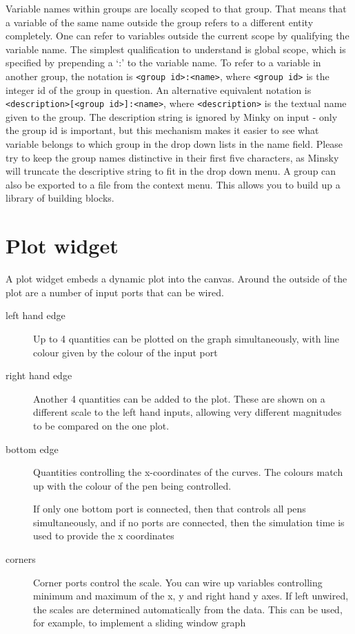 Variable names within groups are locally scoped to that group. That
means that a variable of the same name outside the group refers to a
different entity completely. One can refer to variables outside the
current scope by qualifying the variable name. The simplest
qualification to understand is global scope, which is specified by
prepending a `:' to the variable name. To refer to a variable in
another group, the notation is \verb+<group id>:<name>+, where
\verb+<group id>+ is the integer id of the group in question. An
alternative equivalent notation is \verb+<description>[<group id>]:<name>+, where \verb+<description>+ is the textual name given to
the group. The description string is ignored by Minky on input - only
the group id is important, but this mechanism makes it easier to see
what variable belongs to which group in the drop down lists in the
name field. Please try to keep the group names distinctive in their
first five characters, as Minsky will truncate the descriptive string
to fit in the drop down menu. A group can also be exported to a file from the context menu.
This allows you to build up a library of building blocks.

\section{Plot widget}
\label{Plot}

A plot widget embeds a dynamic plot into the canvas. Around the
outside of the plot are a number of input ports that can be wired.


\begin{description}
\item[left hand edge] Up to 4 quantities can be plotted on the graph
  simultaneously, with line colour given by the colour of the input
  port
\item[right hand edge] Another 4 quantities can be added to the
  plot. These are shown on a different scale to the left hand inputs,
  allowing very different magnitudes to be compared on the one plot.
\item[bottom edge] Quantities controlling the x-coordinates of the
  curves. The colours match up with the colour of the pen being
  controlled.


  If only one bottom port is connected, then that controls all pens
  simultaneously, and if no ports are connected, then the simulation
  time is used to provide the x coordinates
\item[corners] Corner ports control the scale. You can wire up
  variables controlling minimum and maximum of the x, y and right hand
  y axes. If left unwired, the scales are determined automatically
  from the data. This can be used, for example, to implement a sliding
  window graph

\end{description}

